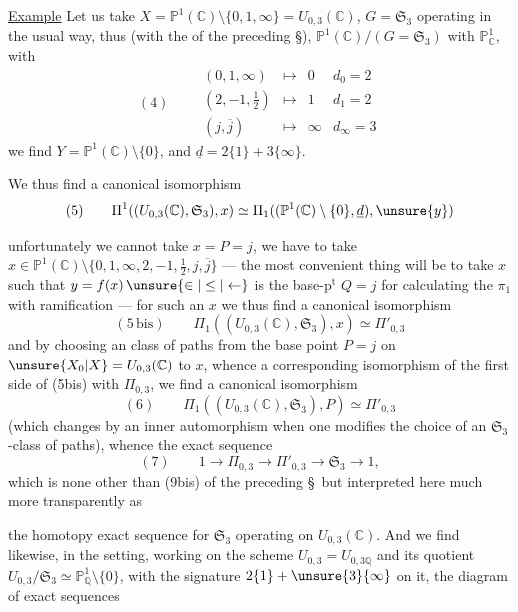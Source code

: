 \uline{Example} Let us take $X=\mathbb P^1(\mathbb C)\setminus\{0,1,\infty\}=U_{0,3}(\mathbb C)$,
$G=\mathfrak S_3$ operating in the usual way, thus (with the   of the preceding \S),
 $\mathbb P^1(\mathbb C)/(G=\mathfrak S_3)$ with $\mathbb P^1_{\mathbb C}$, with
\[
(4)\qquad
\begin{array}{rcll}
(0,1,\infty)&\longmapsto&0&d_0=2\\
(2,-1,\tfrac12)&\longmapsto&1&d_1=2\\
(j,\overline j)&\longmapsto&\infty&d_\infty=3
\end{array}
\]
we find $Y=\mathbb P^1(\mathbb C)\setminus\{0\}$, and $\underline d=2\{1\}+3\{\infty\}$.

We thus find a canonical isomorphism
\[
(5)\qquad
\Pi^{1}((U_{0,3}(\mathbb C),\mathfrak S_3),x)
\simeq\Pi_1((\mathbb P^1(\mathbb C)\setminus\{0\},\underline d),\unsure{y})
\]


 unfortunately we cannot take $x=P=j$, we have to take
$x\in\mathbb P^1(\mathbb C)\setminus\{0,1,\infty,2,-1,\tfrac12,j,\overline j\}$
--- the most convenient thing will be to take $x$ such that $y=f(x)\,\unsure{\in|\leq|\leftarrow}$ is the  base-$\mathrm p^{\mathrm t}$ $Q=j$ for calculating the $\pi_1$ with ramification --- for such an $x$ we thus find a canonical isomorphism
\[
(5\,\mathrm{bis})\qquad
\Pi_1((U_{0,3}(\mathbb C),\mathfrak S_3),x)\simeq\Pi'_{0,3}
\]
and by choosing an class of paths from the  base point $P=j$ on $\unsure{X_0|X}=U_{0,3}(\mathbb C)$ to $x$, whence a corresponding isomorphism of the first side of (5bis)  with $\Pi_{0,3}$, we find a canonical isomorphism
\[
(6)\qquad
\Pi_1((U_{0,3}(\mathbb C),\mathfrak S_3),P)\simeq\Pi'_{0,3}
\]
(which changes by an inner automorphism when one modifies the choice of an $\mathfrak S_3$-class of paths), whence the exact sequence
\[
(7)\qquad
1\longrightarrow\Pi_{0,3}\longrightarrow\Pi'_{0,3}\longrightarrow\mathfrak S_3\longrightarrow 1,
\]
which is none other than (9bis) of the preceding \S\, but interpreted here much more transparently as

the homotopy exact sequence for $\mathfrak{S}_3$ operating
on $U_{0,3}(\mathbb{C})$. And we find likewise,
in the  setting,
working on the scheme $U_{0,3}=U_{0,3\mathbb{Q}}$ and its
quotient $U_{0,3}/\mathfrak{S}_3\simeq\mathbb{P}^{1}_{\mathbb{Q}}\setminus\{0\}$, with
the signature $2\{1\}+\unsure{3}\{\infty\}$ on it, the
diagram of exact sequences

